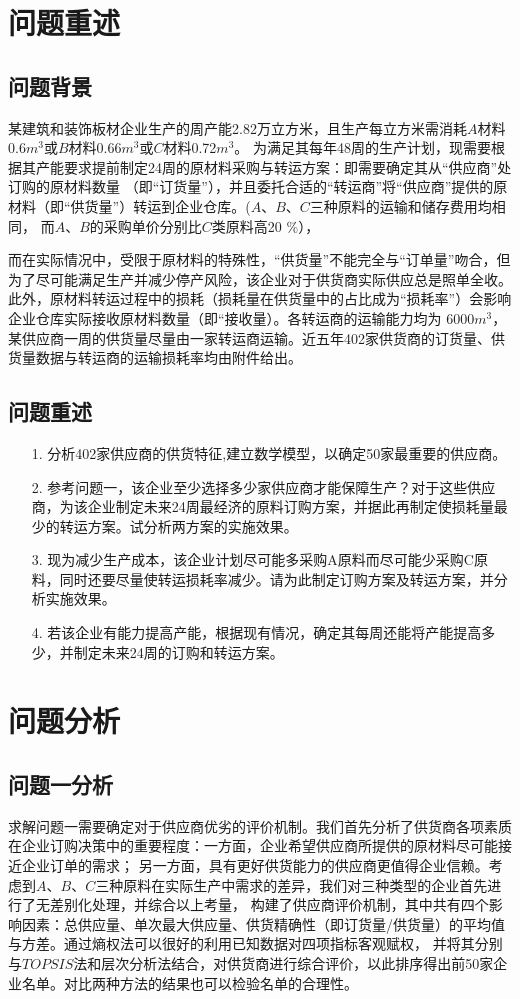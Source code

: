 \documentclass[withoutpreface,bwprint]{cumcmthesis}
\begin{document}
\section{问题重述}
\subsection{问题背景}
某建筑和装饰板材企业生产的周产能2.82万立方米，且生产每立方米需消耗$A$材料0.6$m^{3}$或$B$材料0.66$m^{3}$或$C$材料0.72$m^{3}$。
为满足其每年48周的生产计划，现需要根据其产能要求提前制定24周的原材料采购与转运方案：即需要确定其从“供应商”处订购的原材料数量
（即“订货量”），并且委托合适的“转运商”将“供应商”提供的原材料（即“供货量”）转运到企业仓库。($A$、$B$、$C$三种原料的运输和储存费用均相同，
而$A$、$B$的采购单价分别比$C$类原料高20 $\%$），\par
而在实际情况中，受限于原材料的特殊性，“供货量”不能完全与“订单量”吻合，但为了尽可能满足生产并减少停产风险，该企业对于供货商实际供应总是照单全收。
此外，原材料转运过程中的损耗（损耗量在供货量中的占比成为“损耗率”）会影响企业仓库实际接收原材料数量（即“接收量）。各转运商的运输能力均为
6000$m^{3}$，某供应商一周的供货量尽量由一家转运商运输。近五年402家供货商的订货量、供货量数据与转运商的运输损耗率均由附件给出。\par
\subsection{问题重述}
\begin{enumerate}
    \item [1.] 分析402家供应商的供货特征,建立数学模型，以确定50家最重要的供应商。
    \item [2.] 参考问题一，该企业至少选择多少家供应商才能保障生产？对于这些供应商，为该企业制定未来24周最经济的原料订购方案，并据此再制定使损耗量最少的转运方案。试分析两方案的实施效果。
    \item [3.] 现为减少生产成本，该企业计划尽可能多采购A原料而尽可能少采购C原料，同时还要尽量使转运损耗率减少。请为此制定订购方案及转运方案，并分析实施效果。
    \item [4.] 若该企业有能力提高产能，根据现有情况，确定其每周还能将产能提高多少，并制定未来24周的订购和转运方案。
\end{enumerate}


\section{问题分析}
\subsection{问题一分析}
求解问题一需要确定对于供应商优劣的评价机制。我们首先分析了供货商各项素质在企业订购决策中的重要程度：一方面，企业希望供应商所提供的原材料尽可能接近企业订单的需求；
另一方面，具有更好供货能力的供应商更值得企业信赖。考虑到$A$、$B$、$C$三种原料在实际生产中需求的差异，我们对三种类型的企业首先进行了无差别化处理，并综合以上考量，
构建了供应商评价机制，其中共有四个影响因素：总供应量、单次最大供应量、供货精确性（即订货量/供货量）的平均值与方差。通过熵权法可以很好的利用已知数据对四项指标客观赋权，
并将其分别与$TOPSIS$法和层次分析法结合，对供货商进行综合评价，以此排序得出前50家企业名单。对比两种方法的结果也可以检验名单的合理性。
\end{document}
